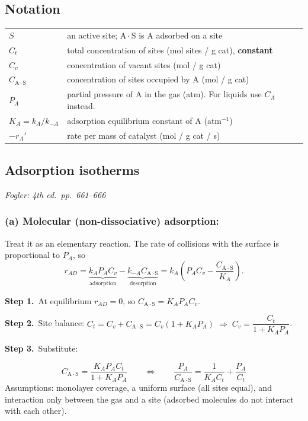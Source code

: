 \documentclass[11pt]{article}
\newcommand{\step}[1]{\par\smallskip\textcolor{stepgray}{\textbf{Step #1.}}\ }
\newcommand{\fogler}[1]{\hfill{\small\textit{\textcolor{keyblue}{Fogler: #1}}}}
\newcommand{\AS}[1]{\mathrm{#1\!\cdot\!S}}
\begin{document}
\subsection{Notation}
\begin{center}
\renewcommand{\arraystretch}{1.2}
\begin{tabular}{ll}
\toprule
$S$ & an active site; $\AS{A}$ is A adsorbed on a site\\
$C_t$ & total concentration of sites (mol sites / g cat), \textbf{constant}\\
$C_v$ & concentration of vacant sites (mol / g cat)\\
$C_{\AS{A}}$ & concentration of sites occupied by A (mol / g cat)\\
$P_A$ & partial pressure of A in the gas (atm). For liquids use $C_A$ instead.\\
$K_A=k_A/k_{-A}$ & adsorption equilibrium constant of A (atm$^{-1}$)\\
$-r_A'$ & rate per mass of catalyst (mol / g cat / s)\\
\bottomrule
\end{tabular}
\end{center}

\subsection{Adsorption isotherms}
\fogler{4th ed.\ pp.~661--666}

\subsubsection*{(a) Molecular (non-dissociative) adsorption: }
Treat it as an elementary reaction. The rate of collisions with the surface is proportional to $P_A$, so
\[
r_{AD}=\underbrace{k_AP_AC_v}_{\text{adsorption}}-\underbrace{k_{-A}C_{\AS{A}}}_{\text{desorption}}
=k_A\left(P_AC_v-\frac{C_{\AS{A}}}{K_A}\right).
\]
\step{1}At equilibrium $r_{AD}=0$, so $C_{\AS{A}}=K_AP_AC_v$.

\step{2}Site balance: $C_t=C_v+C_{\AS{A}}=C_v(1+K_AP_A)\;\Rightarrow\;C_v=\dfrac{C_t}{1+K_AP_A}$.

\step{3}Substitute:
\begin{keyresult}
\[
C_{\AS{A}}=\frac{K_AP_AC_t}{1+K_AP_A}
\qquad\Longleftrightarrow\qquad
\frac{P_A}{C_{\AS{A}}}=\frac{1}{K_AC_t}+\frac{P_A}{C_t}
\]
Assumptions: monolayer coverage, a uniform surface (all sites equal), and interaction only between the gas and a site
(adsorbed molecules do not interact with each other).
\end{keyresult}
\end{document}
